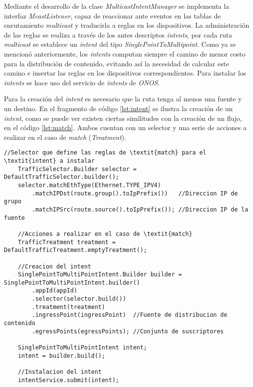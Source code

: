 Mediante el desarrollo de la clase \textit{MulticastIntentManager} se implementa la interfaz \textit{McastListener}, capaz de reaccionar ante eventos en las tablas de enrutamiento \textit{multicast} y traducirla a reglas en los dispositivos. La administración de las reglas se realiza a través de los antes descriptos \textit{intents}, por cada ruta \textit{multicast} se establece un \textit{intent} del tipo \textit{SinglePointToMultipoint}. Como ya se mencionó anteriormente, los \textit{intents} computan siempre el camino de menor costo para la distribución de contenido, evitando así la necesidad de calcular este camino e insertar las reglas en los dispositivos correspondientes. Para instalar los \textit{intents} se hace uso del servicio de \textit{intents} de \textit{ONOS}. \

Para la creación del \textit{intent} es necesario que la ruta tenga al menos una fuente y un destino. En el fragmento de código \ref{lst:intent} se ilustra la creación de un \textit{intent}, como se puede ver existen ciertas similitudes con la creación de un flujo, en el código \ref{lst:match}. Ambos cuentan con un selector y una serie de acciones a realizar en el caso de \textit{match} (\textit{Treatment}).

\begin{lstlisting}[caption={Fragmento de código que muestra la creación de un \textit{SinglePointToMultipoint}}, captionpos=b, label={lst:intent}]
    //Selector que define las reglas de \textit{match} para el \textit{intent} a instalar
    TrafficSelector.Builder selector = DefaultTrafficSelector.builder();
    selector.matchEthType(Ethernet.TYPE_IPV4)
        .matchIPDst(route.group().toIpPrefix())   //Direccion IP de grupo
        .matchIPSrc(route.source().toIpPrefix()); //Direccion IP de la fuente

    //Acciones a realizar en el caso de \textit{match}
    TrafficTreatment treatment = DefaultTrafficTreatment.emptyTreatment();

    //Creacion del intent
    SinglePointToMultiPointIntent.Builder builder = SinglePointToMultiPointIntent.builder()
        .appId(appId)
        .selector(selector.build())
        .treatment(treatment)
        .ingressPoint(ingressPoint)  //Fuente de distribucion de contenido
        .egressPoints(egressPoints); //Conjunto de suscriptores

    SinglePointToMultiPointIntent intent;
    intent = builder.build();

    //Instalacion del intent  
    intentService.submit(intent);
    
\end{lstlisting}

